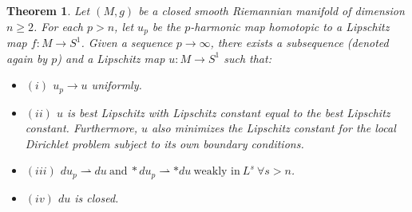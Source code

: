 \documentclass{ip-journal}
\newtheorem{theorem}{Theorem}[section]
\theoremstyle{definition}
\numberwithin{equation}{section}
\begin{document}
\begin{theorem}\label{thm:limminimizer}
Let $(M, g)$ be a closed  smooth Riemannian manifold  of dimension $n \geq 2$.  
For each $p>n$, let $u_p$ be the $p$-harmonic map homotopic to  
 a Lipschitz map $f: M \rightarrow S^1$. Given a sequence $p \rightarrow \infty$, there exists a subsequence (denoted again by $p$)  and a  Lipschitz map $u: M \rightarrow S^1$ such that:
\begin{itemize}
\item $(i)$ $u_p \rightarrow u$ uniformly.
\item $(ii)$ $u$ is  best Lipschitz with Lipschitz constant equal to the best Lipschitz constant. Furthermore, $u$ also minimizes the Lipschitz constant for the local  Dirichlet problem subject to its own boundary conditions.
\item $(iii)$ $du_p  \rightharpoonup du \ \mbox{and} \ *du_p \rightharpoonup *du \ \mbox{weakly in} \  L^s \ \forall s>n$.
\item  $(iv)$ $du$ is closed. 
\end{itemize}
\end{theorem}
\end{document}
